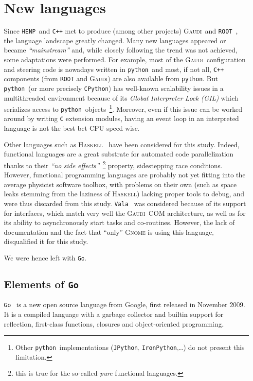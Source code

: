 \documentclass[a4paper]{jpconf}
\newcommand{\gaudi}{\textsc{Gaudi}}
\newcommand{\python}{\texttt{python}}
\newcommand{\golang}{\texttt{Go}}
\newcommand{\henp}{\texttt{HENP}}
\begin{document}
\section{New languages}
Since \henp\ and {\tt C++} met to produce (among other projects)
\gaudi\ and {\tt ROOT}~\cite{ref-root}, the language landscape greatly
changed.
Many new languages appeared or became \emph{``mainstream''} and, while
closely following the trend was not achieved, some adaptations were performed.
For example, most of the \gaudi\ configuration and steering code is
nowadays written in \python\ and most, if not all, {\tt C++} components
(from {\tt ROOT} and \gaudi) are also available from \python.
But \python\ (or more precisely {\tt CPython}) has well-known
scalability issues in a multithreaded environment because of its
\emph{Global Interpreter Lock (GIL)} which serializes access to
\python\ objects~\footnote{Other \python\ implementations
  (\texttt{JPython}, \texttt{IronPython},\ldots) do not
  present this limitation.}.
Moreover, even if this issue can be worked around by writing {\tt C}
extension modules, having an event loop in an interpreted language
is not the best bet CPU-speed wise.

Other languages such as \textsc{Haskell}~\cite{ref-haskell} have been
considered for this study.
Indeed, functional languages are a great substrate for automated code
parallelization~\cite{ref-auto-parallel-fp} thanks to their \emph{``no
  side effects''}~\footnote{this is true for the so-called \emph{pure}
functional languages.} property, sidestepping race conditions.
However, functional programming languages are probably not yet fitting
into the average physicist software toolbox, with problems on their own
(such as space leaks stemming from the laziness of \textsc{Haskell})
lacking proper tools to debug, and were thus discarded from this study.
\texttt{Vala}~\cite{ref-vala} was considered because of its support
for interfaces, which match very well the \gaudi\ COM architecture, as
well as for its ability to asynchronously start tasks and co-routines.
However, the lack of documentation and the fact that ``only''
\textsc{Gnome} is using this language, disqualified it for this
study.

We were hence left with \golang.

\subsection{Elements of \golang}
\golang~\cite{ref-golang} is a new open source language from Google,
first released in November 2009.
It is a compiled language with a garbage collector and builtin support
for reflection, first-class functions, closures and object-oriented
programming.
\end{document}
